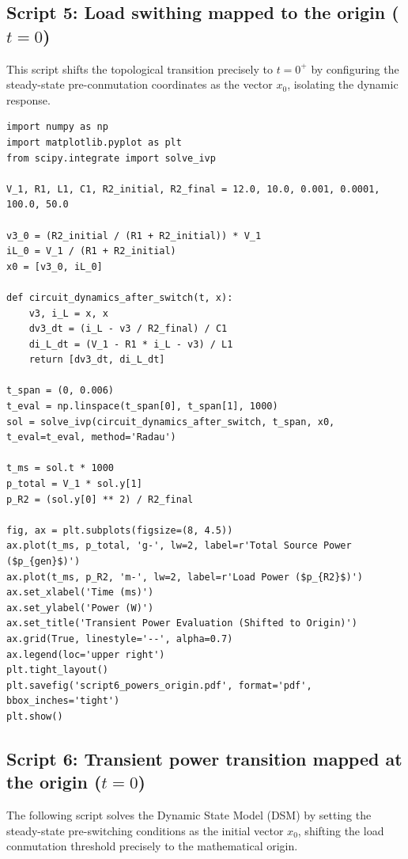\documentclass[11pt, a4paper]{article}
\begin{document}
\subsection*{Script 5: Load swithing mapped to the origin ($t=0$)}
This script shifts the topological transition precisely to $t=0^+$ by configuring the steady-state pre-conmutation coordinates as the vector $x_0$, isolating the dynamic response.

{\footnotesize
\begin{verbatim}
import numpy as np
import matplotlib.pyplot as plt
from scipy.integrate import solve_ivp

V_1, R1, L1, C1, R2_initial, R2_final = 12.0, 10.0, 0.001, 0.0001, 100.0, 50.0

v3_0 = (R2_initial / (R1 + R2_initial)) * V_1
iL_0 = V_1 / (R1 + R2_initial)
x0 = [v3_0, iL_0]

def circuit_dynamics_after_switch(t, x):
    v3, i_L = x, x
    dv3_dt = (i_L - v3 / R2_final) / C1
    di_L_dt = (V_1 - R1 * i_L - v3) / L1
    return [dv3_dt, di_L_dt]

t_span = (0, 0.006)
t_eval = np.linspace(t_span[0], t_span[1], 1000)
sol = solve_ivp(circuit_dynamics_after_switch, t_span, x0, t_eval=t_eval, method='Radau')

t_ms = sol.t * 1000
p_total = V_1 * sol.y[1]
p_R2 = (sol.y[0] ** 2) / R2_final

fig, ax = plt.subplots(figsize=(8, 4.5))
ax.plot(t_ms, p_total, 'g-', lw=2, label=r'Total Source Power ($p_{gen}$)')
ax.plot(t_ms, p_R2, 'm-', lw=2, label=r'Load Power ($p_{R2}$)')
ax.set_xlabel('Time (ms)')
ax.set_ylabel('Power (W)')
ax.set_title('Transient Power Evaluation (Shifted to Origin)')
ax.grid(True, linestyle='--', alpha=0.7)
ax.legend(loc='upper right')
plt.tight_layout()
plt.savefig('script6_powers_origin.pdf', format='pdf', bbox_inches='tight')
plt.show()
\end{verbatim}
}


\subsection*{Script 6: Transient power transition mapped at the origin ($t=0$)}
The following script solves the Dynamic State Model (DSM) by setting the steady-state pre-switching conditions as the initial vector $x_0$, shifting the load conmutation threshold precisely to the mathematical origin.
\end{document}

